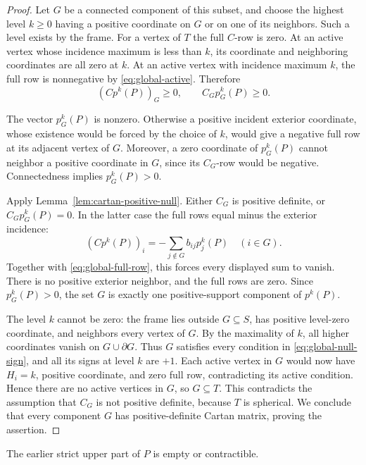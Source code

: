 \begin{proof}
Let $G$ be a connected component of this subset, and choose the highest
level $k\ge0$ having a positive coordinate on $G$ or on one of its
neighbors.  Such a level exists by the frame.  For a vertex of $T$ the
full $C$-row is zero.  At an active vertex whose incidence maximum is
less than $k$, its coordinate and neighboring coordinates are all zero
at $k$.  At an active vertex with incidence maximum $k$, the full row is
nonnegative by \eqref{eq:global-active}.  Therefore
\begin{equation}\label{eq:global-full-row}
 (Cp^k(P))_G\ge0,
 \qquad C_Gp_G^k(P)\ge0.
\end{equation}

The vector $p_G^k(P)$ is nonzero.  Otherwise a positive incident exterior
coordinate, whose existence would be forced by the choice of $k$, would
give a negative full row at its adjacent vertex of $G$.  Moreover, a
zero coordinate of $p_G^k(P)$ cannot neighbor a positive coordinate in
$G$, since its $C_G$-row would be negative.  Connectedness implies
$p_G^k(P)>0$.

Apply Lemma~\ref{lem:cartan-positive-null}.  Either $C_G$ is positive
definite, or $C_Gp_G^k(P)=0$.  In the latter case the full rows equal
minus the exterior incidence:
\[
 (Cp^k(P))_i=-\sum_{j\notin G}b_{ij}p_j^k(P)
 \quad(i\in G).
\]
Together with \eqref{eq:global-full-row}, this forces every displayed
sum to vanish.  There is no positive exterior neighbor, and the full
rows are zero.  Since $p_G^k(P)>0$, the set $G$ is exactly one
positive-support component of $p^k(P)$.

The level $k$ cannot be zero: the frame lies outside $G\subseteq S$,
has positive level-zero coordinate, and neighbors every vertex of $G$.
By the maximality of $k$, all higher coordinates vanish on
$G\cup\partial G$.  Thus $G$ satisfies every condition in
\eqref{eq:global-null-sign}, and all its signs at level $k$ are $+1$.
Each active vertex in $G$ would now have $H_i=k$, positive coordinate,
and zero full row, contradicting its active condition.  Hence there are
no active vertices in $G$, so $G\subseteq T$.  This contradicts the
assumption that $C_G$ is not positive definite, because $T$ is
spherical.  We conclude that every component $G$ has positive-definite
Cartan matrix, proving the assertion.
\end{proof}

\begin{proposition}\label{prop:global-upper-link}
The earlier strict upper part of $P$ is empty or contractible.
\end{proposition}

